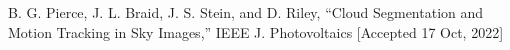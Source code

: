 \documentclass[10pt]{article}
\begin{document}
{\begin{newitemize}
    
    \item{{ B. G. Pierce}, J. L. Braid, J. S. Stein, and D. Riley, ``Cloud Segmentation and Motion Tracking in Sky Images,” IEEE J. Photovoltaics [Accepted 17 Oct, 2022] }
    
    
    
    
    
    
    
    
%                

\end{newitemize}}
\end{document}
